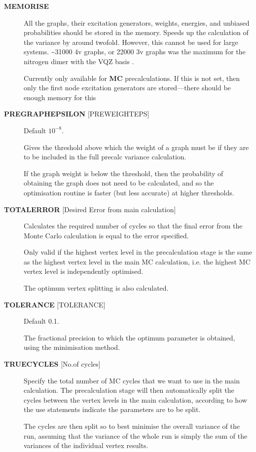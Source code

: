 \documentclass[openany,a4paper,10pt]{manual}
\begin{document}
\begin{description}
\item[\textbf{MEMORISE}]
All the graphs, their excitation generators, weights, energies, and
unbiased probabilities should be stored in the memory.  Speeds up
the calculation of the variance by around twofold. However, this
cannot be used for large systems.  \textasciitilde{}31000 4v graphs, or 22000 3v
graphs was the maximum for the nitrogen dimer with the VQZ basis .

Currently only available for \textbf{MC} precalculations. If this is not
set, then only the first node excitation generators are stored---there
should be enough memory for this

\item[\textbf{PREGRAPHEPSILON} {[}PREWEIGHTEPS{]}]
Default $10^{-8}$.

Gives the threshold above which the weight of a graph must be if
they are to be included in the full precalc variance calculation.

If the graph weight is below the threshold, then the probability
of obtaining the graph does not need to be calculated, and so
the optimisation routine is faster (but less accurate) at higher
thresholds.

\item[\textbf{TOTALERROR} {[}Desired Error from main calculation{]}]
Calculates the required number of cycles so that the final
error from the Monte Carlo calculation is equal to the error specified.

Only valid if the highest vertex level in the precalculation stage is the
same as the highest vertex level in the main MC calculation, i.e. the
highest MC vertex level is independently optimised.

The optimum vertex splitting is also calculated.

\item[\textbf{TOLERANCE} {[}TOLERANCE{]}]
Default 0.1.

The fractional precision to which the optimum parameter is obtained,
using the minimisation method.

\item[\textbf{TRUECYCLES} {[}No.of cycles{]}]
Specify the total number of MC cycles that we want to use in the
main calculation.  The precalculation stage will then automatically
split the cycles between the vertex levels in the main calculation,
according to how the use statements indicate the parameters are to
be split.

The cycles are then split so to best minimise the overall variance
of the run, assuming that the variance of the whole run is simply
the sum of the variances of the individual vertex results.

\end{description}
\end{document}
